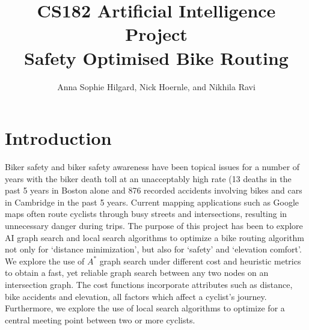 \documentclass[11pt]{article}
\title{CS182 Artificial Intelligence Project \\ \Large{Safety Optimised Bike Routing}}
\author{Anna Sophie Hilgard, Nick Hoernle, and Nikhila Ravi}
\begin{document}
\maketitle{}



\setlength{\parindent}{2em}
\setlength{\parskip}{1em}
\renewcommand{\baselinestretch}{1.3}

\section{Introduction}

Biker safety and biker safety awareness have been topical issues for a number of years with the biker death toll at an unacceptably high rate (13 deaths in the past 5 years in Boston alone and 876 recorded accidents involving bikes and cars in Cambridge in the past 5 years. Current mapping applications such as Google maps often route cyclists through busy streets and intersections, resulting in unnecessary danger during trips. The purpose of this project has been to explore AI graph search and local search algorithms to optimize a bike routing algorithm not only for `distance minimization', but also for `safety' and `elevation comfort'. We explore the use of $A^{*}$ graph search under different cost and heuristic metrics to obtain a fast, yet reliable graph search between any two nodes on an intersection graph. The cost functions incorporate attributes such as distance, bike accidents and elevation, all factors which affect a cyclist's journey. Furthermore, we explore the use of local search algorithms to optimize for a central meeting point between two or more cyclists.


\end{document}
